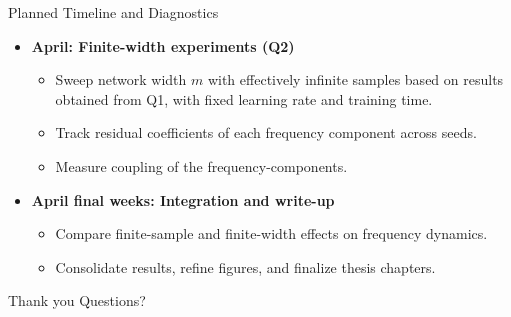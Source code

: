 \documentclass[10pt,aspectratio=169]{beamer}
\begin{document}
\begin{frame}{Planned Timeline and Diagnostics}
	\begin{itemize}
		\item \textbf{April: Finite-width experiments (Q2)}
		      \begin{itemize}
			      \item Sweep network width $m$ with effectively infinite samples based
			            on results obtained from Q1, with fixed learning rate and training time.
			      \item Track residual coefficients of each frequency component across seeds.
			      \item Measure coupling of the frequency-components.
		      \end{itemize}
		      \vspace{0.4em}
		\item \textbf{April final weeks: Integration and write-up}
		      \begin{itemize}
			      \item Compare finite-sample and finite-width effects on frequency dynamics.
			      \item Consolidate results, refine figures, and finalize thesis chapters.
		      \end{itemize}

	\end{itemize}
\end{frame}

\begin{frame}{Thank you}
	Questions?
\end{frame}

\end{document}
